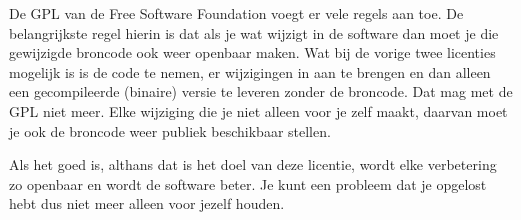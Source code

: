 De GPL van de Free Software Foundation voegt er vele regels aan toe. De belangrijkste regel hierin is dat als je wat
wijzigt in de software dan moet je die gewijzigde broncode ook weer openbaar maken. Wat bij de vorige twee licenties
mogelijk is is de code te nemen, er wijzigingen in aan te brengen en dan alleen een gecompileerde (binaire) versie te
leveren zonder de broncode. Dat mag met de GPL niet meer. Elke wijziging die je niet alleen voor je zelf maakt, daarvan
moet je ook de broncode weer publiek beschikbaar stellen.\par

Als het goed is, althans dat is het doel van deze licentie, wordt elke verbetering zo openbaar en wordt de software
beter. Je kunt een probleem dat je opgelost hebt dus niet meer alleen voor jezelf houden.
